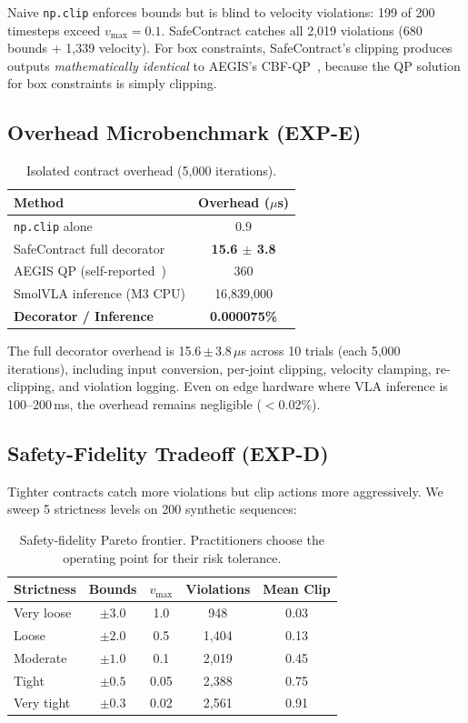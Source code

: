 \documentclass[conference]{IEEEtran}
\begin{document}
Naive \texttt{np.clip} enforces bounds but is blind to velocity violations: 199 of 200 timesteps exceed $v_{\max} = 0.1$.
SafeContract catches all 2{,}019 violations (680 bounds + 1{,}339 velocity).
For box constraints, SafeContract's clipping produces outputs \emph{mathematically identical} to AEGIS's CBF-QP~\cite{aegis}, because the QP solution for box constraints is simply clipping.

\subsection{Overhead Microbenchmark (EXP-E)}
\label{sec:overhead}

\begin{table}[h]
\centering
\caption{Isolated contract overhead (5{,}000 iterations).}
\label{tab:overhead}
\begin{tabular}{lc}
\toprule
Method & Overhead ($\mu$s) \\
\midrule
\texttt{np.clip} alone & 0.9 \\
SafeContract full decorator & \textbf{15.6 $\pm$ 3.8} \\
AEGIS QP (self-reported~\cite{aegis}) & 360 \\
\midrule
SmolVLA inference (M3 CPU) & 16{,}839{,}000 \\
\textbf{Decorator / Inference} & \textbf{0.000075\%} \\
\bottomrule
\end{tabular}
\end{table}

The full decorator overhead is 15.6\,$\pm$\,3.8\,$\mu$s across 10 trials (each 5{,}000 iterations), including input conversion, per-joint clipping, velocity clamping, re-clipping, and violation logging.
Even on edge hardware where VLA inference is 100--200\,ms, the overhead remains negligible ($<$0.02\%).

\subsection{Safety-Fidelity Tradeoff (EXP-D)}

Tighter contracts catch more violations but clip actions more aggressively. We sweep 5 strictness levels on 200 synthetic sequences:

\begin{table}[h]
\centering
\caption{Safety-fidelity Pareto frontier. Practitioners choose the operating point for their risk tolerance.}
\label{tab:pareto}
\begin{tabular}{lcccc}
\toprule
Strictness & Bounds & $v_{\max}$ & Violations & Mean Clip \\
\midrule
Very loose & $\pm 3.0$ & 1.0 & 948 & 0.03 \\
Loose & $\pm 2.0$ & 0.5 & 1{,}404 & 0.13 \\
Moderate & $\pm 1.0$ & 0.1 & 2{,}019 & 0.45 \\
Tight & $\pm 0.5$ & 0.05 & 2{,}388 & 0.75 \\
Very tight & $\pm 0.3$ & 0.02 & 2{,}561 & 0.91 \\
\bottomrule
\end{tabular}
\end{table}
\end{document}
